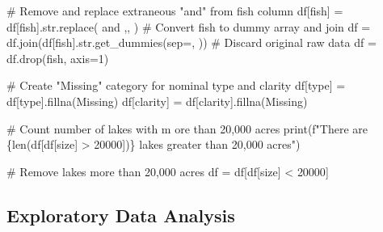 \documentclass[
]{article}
\newenvironment{Shaded}{\begin{snugshade}}{\end{snugshade}}
\newcommand{\BuiltInTok}[1]{\textcolor[rgb]{0.00,0.23,0.31}{#1}}
\newcommand{\CommentTok}[1]{\textcolor[rgb]{0.37,0.37,0.37}{#1}}
\newcommand{\DecValTok}[1]{\textcolor[rgb]{0.68,0.00,0.00}{#1}}
\newcommand{\NormalTok}[1]{\textcolor[rgb]{0.00,0.23,0.31}{#1}}
\newcommand{\OperatorTok}[1]{\textcolor[rgb]{0.37,0.37,0.37}{#1}}
\newcommand{\SpecialCharTok}[1]{\textcolor[rgb]{0.37,0.37,0.37}{#1}}
\newcommand{\SpecialStringTok}[1]{\textcolor[rgb]{0.13,0.47,0.30}{#1}}
\newcommand{\StringTok}[1]{\textcolor[rgb]{0.13,0.47,0.30}{#1}}
\begin{document}
\begin{Shaded}
\begin{Highlighting}[]
\CommentTok{\# Remove and replace extraneous "and" from fish column}
\NormalTok{df[}\StringTok{\textquotesingle{}fish\textquotesingle{}}\NormalTok{] }\OperatorTok{=}\NormalTok{ df[}\StringTok{\textquotesingle{}fish\textquotesingle{}}\NormalTok{].}\BuiltInTok{str}\NormalTok{.replace(}\StringTok{\textquotesingle{} and \textquotesingle{}}\NormalTok{,}\StringTok{\textquotesingle{}, \textquotesingle{}}\NormalTok{)}
\CommentTok{\# Convert fish to dummy array and join}
\NormalTok{df }\OperatorTok{=}\NormalTok{ df.join(df[}\StringTok{\textquotesingle{}fish\textquotesingle{}}\NormalTok{].}\BuiltInTok{str}\NormalTok{.get\_dummies(sep}\OperatorTok{=}\StringTok{\textquotesingle{}, \textquotesingle{}}\NormalTok{))}
\CommentTok{\# Discard original raw data}
\NormalTok{df }\OperatorTok{=}\NormalTok{ df.drop(}\StringTok{\textquotesingle{}fish\textquotesingle{}}\NormalTok{, axis}\OperatorTok{=}\DecValTok{1}\NormalTok{)}

\CommentTok{\# Create "Missing" category for nominal type and clarity}
\NormalTok{df[}\StringTok{\textquotesingle{}type\textquotesingle{}}\NormalTok{] }\OperatorTok{=}\NormalTok{ df[}\StringTok{\textquotesingle{}type\textquotesingle{}}\NormalTok{].fillna(}\StringTok{\textquotesingle{}Missing\textquotesingle{}}\NormalTok{)}
\NormalTok{df[}\StringTok{\textquotesingle{}clarity\textquotesingle{}}\NormalTok{] }\OperatorTok{=}\NormalTok{ df[}\StringTok{\textquotesingle{}clarity\textquotesingle{}}\NormalTok{].fillna(}\StringTok{\textquotesingle{}Missing\textquotesingle{}}\NormalTok{)}

\CommentTok{\# Count number of lakes with m ore than 20,000 acres}
\BuiltInTok{print}\NormalTok{(}\SpecialStringTok{f"There are }\SpecialCharTok{\{}\BuiltInTok{len}\NormalTok{(df[df[}\StringTok{\textquotesingle{}size\textquotesingle{}}\NormalTok{] }\OperatorTok{\textgreater{}} \DecValTok{20000}\NormalTok{])}\SpecialCharTok{\}}\SpecialStringTok{ lakes greater than 20,000 acres"}\NormalTok{)}

\CommentTok{\# Remove lakes more than 20,000 acres}
\NormalTok{df }\OperatorTok{=}\NormalTok{ df[df[}\StringTok{\textquotesingle{}size\textquotesingle{}}\NormalTok{] }\OperatorTok{\textless{}} \DecValTok{20000}\NormalTok{]}
\end{Highlighting}
\end{Shaded}

\subsection{Exploratory Data Analysis}\label{exploratory-data-analysis}
\end{document}
